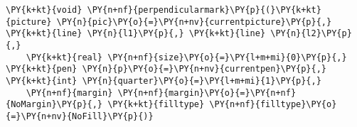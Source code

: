 \begin{Verbatim}[commandchars=\\\{\}]
    \PY{k+kt}{void} \PY{n+nf}{perpendicularmark}\PY{p}{(}\PY{k+kt}{picture} \PY{n}{pic}\PY{o}{=}\PY{n+nv}{currentpicture}\PY{p}{,} \PY{k+kt}{line} \PY{n}{l1}\PY{p}{,} \PY{k+kt}{line} \PY{n}{l2}\PY{p}{,}
    \PY{k+kt}{real} \PY{n+nf}{size}\PY{o}{=}\PY{l+m+mi}{0}\PY{p}{,} \PY{k+kt}{pen} \PY{n}{p}\PY{o}{=}\PY{n+nv}{currentpen}\PY{p}{,} \PY{k+kt}{int} \PY{n}{quarter}\PY{o}{=}\PY{l+m+mi}{1}\PY{p}{,}
    \PY{n+nf}{margin} \PY{n+nf}{margin}\PY{o}{=}\PY{n+nf}{NoMargin}\PY{p}{,} \PY{k+kt}{filltype} \PY{n+nf}{filltype}\PY{o}{=}\PY{n+nv}{NoFill}\PY{p}{)}
\end{Verbatim}
